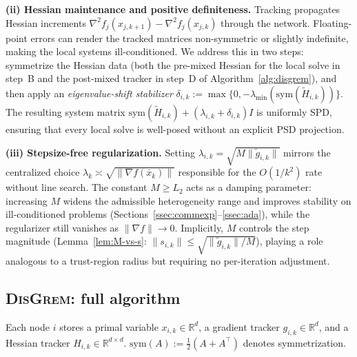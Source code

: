 \documentclass[11pt,a4paper]{article}
\def\cO{O}%
\newcommand{\R}{\mathbb{R}}
\newcommand{\cO}{\mathcal{O}}
\begin{document}
	\textbf{(ii) Hessian maintenance and positive definiteness.}
	Tracking propagates Hessian increments
	$\nabla^2 f_j(x_{j,k+1})-\nabla^2 f_j(x_{j,k})$ through the
	network.
	Floating-point errors can render the tracked matrices
	non-symmetric or slightly indefinite, making the local systems
	ill-conditioned.
	We address this in two steps: symmetrize the Hessian data
	(both the pre-mixed Hessian for the local solve in step~B
	and the post-mixed tracker in step~D of Algorithm~\ref{alg:disgrem}),
	and then apply an \emph{eigenvalue-shift stabilizer}
	$\delta_{i,k}:=\max\{0,-\lambda_{\min}(\mathrm{sym}(\tilde H_{i,k}))\}$.
	The resulting system matrix
	$\mathrm{sym}(\tilde H_{i,k})+(\lambda_{i,k}+\delta_{i,k})I$
	is uniformly SPD, ensuring that every local solve is well-posed
	without an explicit PSD projection.
	
	\textbf{(iii) Stepsize-free regularization.}
	Setting $\lambda_{i,k}=\sqrt{M\|\tilde g_{i,k}\|}$ mirrors
	the centralized choice
	$\lambda_k\asymp\sqrt{\|\nabla f(\bar x_k)\|}$ responsible for
	the $\cO(1/k^2)$ rate without line search.
	The constant $M\ge L_2$ acts as a damping parameter: increasing
	$M$ widens the admissible heterogeneity range and improves
	stability on ill-conditioned problems
	(Sections~\ref{ssec:commexp}--\ref{ssec:ada}), while the
	regularizer still vanishes as $\|\nabla f\|\to 0$.
	Implicitly, $M$ controls the step magnitude
	(Lemma~\ref{lem:M-vs-s}: $\|s_{i,k}\|\le\sqrt{\|\tilde g_{i,k}\|/M}$),
	playing a role analogous to a trust-region radius but requiring no
	per-iteration adjustment.
	
	\subsection{\textsc{DisGrem}: full algorithm}\label{ssec:disgrem}
	
	Each node $i$ stores a primal variable $x_{i,k}\in\R^d$, a gradient tracker $g_{i,k}\in\R^d$,
	and a Hessian tracker $H_{i,k}\in\R^{d\times d}$.
	$\mathrm{sym}(A):=\tfrac12(A+A^\top)$ denotes symmetrization.
	
\end{document}
